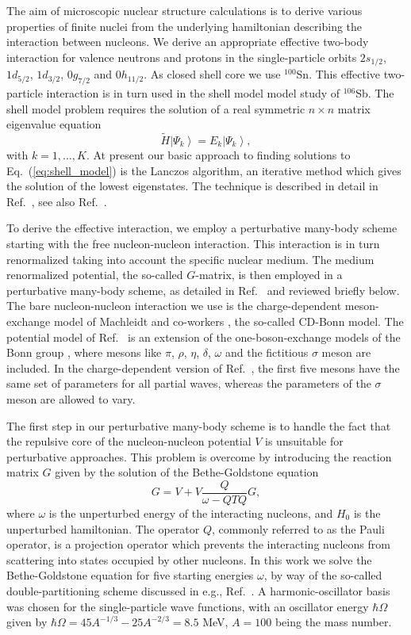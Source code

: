 The aim of microscopic nuclear structure calculations is to derive
various properties of finite nuclei from the underlying 
hamiltonian describing the interaction between 
nucleons. 
We derive an appropriate 
effective two-body interaction for valence neutrons and protons  in the 
single-particle orbits $2s_{1/2}$, $1d_{5/2}$, $1d_{3/2}$, 
$0g_{7/2}$ and $0h_{11/2}$. As closed shell core we use $^{100}$Sn.
This effective two-particle interaction is in turn used in the 
shell model model study of $^{106}$Sb.
The shell model problem requires the solution of a real symmetric
$n \times n$ matrix eigenvalue equation
\begin{equation}
       \tilde{H}\left | \Psi_k\right\rangle  = 
       E_k \left | \Psi_k\right\rangle ,
       \label{eq:shell_model}
\end{equation}
with $k = 1,\ldots, K$. 
At present our basic approach to 
finding solutions to Eq.\ (\ref{eq:shell_model})
is the Lanczos algorithm, an iterative method which gives the solution of
the lowest eigenstates. The 
technique is described in detail in Ref.\ \cite{whit77}, 
see also Ref.\ \cite{ehho95}. 

To derive the effective interaction, we employ 
a  perturbative many-body scheme starting with the free nucleon-nucleon
interaction. This interaction is in turn renormalized
taking into account the specific nuclear medium. The medium
renormalized potential, the so-called $G$-matrix, is then
employed in a perturbative many-body scheme, as detailed in
Ref.\ \cite{hko95} and reviewed briefly below. 
The bare nucleon-nucleon interaction we use is the charge-dependent
meson-exchange model of Machleidt and co-workers \cite{cdbonn}, the so-called
CD-Bonn model.
The potential model of Ref.\ \cite{cdbonn} is an extension of the 
one-boson-exchange models of the Bonn group \cite{mac89}, where mesons 
like $\pi$, $\rho$, $\eta$, $\delta$, $\omega$ and the fictitious
$\sigma$ meson are included. In the charge-dependent version
of Ref.\ \cite{cdbonn}, the first five mesons have the same set
of parameters for all partial waves, whereas the parameters of
the $\sigma$ meson are allowed to vary. 

The first step 
in our perturbative many-body scheme is to handle 
the fact that the repulsive core of the nucleon-nucleon potential $V$
is unsuitable for perturbative approaches. This problem is overcome
by introducing the reaction matrix $G$ given by the solution of the
Bethe-Goldstone equation
\begin{equation}
    G=V+V\frac{Q}{\omega - QTQ}G,
\end{equation}
where $\omega$ is the unperturbed energy of the interacting nucleons,
and $H_0$ is the unperturbed hamiltonian. 
The operator $Q$, commonly referred to
as the Pauli operator, is a projection operator which prevents the
interacting nucleons from scattering into states occupied by other nucleons.
In this work we solve the Bethe-Goldstone equation for five starting
energies $\omega$, by way of the so-called double-partitioning scheme
discussed in e.g.,  Ref.\ \cite{hko95}. 
A harmonic-oscillator basis was chosen for the
single-particle
wave functions, with an oscillator energy $\hbar\Omega$ given
by
$\hbar\Omega = 45A^{-1/3} - 25A^{-2/3}=8.5 $ MeV,  $A=100$ being the mass
number.


